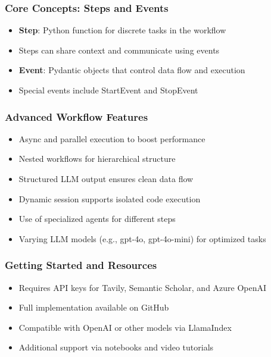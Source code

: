 \begin{frame}[fragile]\frametitle{Core Concepts: Steps and Events}
  \begin{itemize}
    \item \textbf{Step}: Python function for discrete tasks in the workflow
    \item Steps can share context and communicate using events
    \item \textbf{Event}: Pydantic objects that control data flow and execution
    \item Special events include StartEvent and StopEvent
  \end{itemize}
\end{frame}

\begin{frame}[fragile]\frametitle{Advanced Workflow Features}
  \begin{itemize}
    \item Async and parallel execution to boost performance
    \item Nested workflows for hierarchical structure
    \item Structured LLM output ensures clean data flow
    \item Dynamic session supports isolated code execution
    \item Use of specialized agents for different steps
    \item Varying LLM models (e.g., gpt-4o, gpt-4o-mini) for optimized tasks
  \end{itemize}
\end{frame}

\begin{frame}[fragile]\frametitle{Getting Started and Resources}
  \begin{itemize}
    \item Requires API keys for Tavily, Semantic Scholar, and Azure OpenAI
    \item Full implementation available on GitHub
    \item Compatible with OpenAI or other models via LlamaIndex
    \item Additional support via notebooks and video tutorials
  \end{itemize}
\end{frame}

